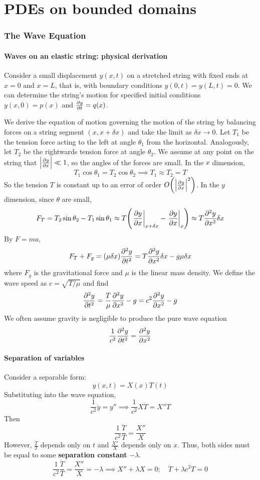 \documentclass[a4paper]{article}
\begin{document}
\clearpage

\part{PDEs on bounded domains}
\section{The Wave Equation}
\subsection{Waves on an elastic string: physical derivation}
Consider a small displacement \( y(x,t) \) on a stretched string with fixed ends at \( x = 0 \) and \( x = L \), that is, with boundary conditions \( y(0,t) = y(L,t) = 0 \).
We can determine the string's motion for specified initial conditions \( y(x,0) = p(x) \) and \( \pdv{y}{t}(x,0) = q(x) \).

We derive the equation of motion governing the motion of the string by balancing forces on a string segment \( (x,x+\delta x) \) and take the limit as \( \delta x \to 0 \).
Let \( T_1 \) be the tension force acting to the left at angle \( \theta_1 \) from the horizontal.
Analogously, let \( T_2 \) be the rightwards tension force at angle \( \theta_2 \).
We assume at any point on the string that \( \abs{\pdv{y}{x}} \ll 1 \), so the angles of the forces are small.
In the \( x \) dimension,
\[
	T_1 \cos \theta_1 = T_2 \cos \theta_2 \implies T_1 \approx T_2 = T
\]
So the tension \( T \) is constant up to an error of order \( O\qty(\abs{\pdv{y}{x}
}^2) \).
In the \( y \) dimension, since \( \theta \) are small,
\[
	F_T = T_2 \sin \theta_2 - T_1 \sin \theta_1 \approx T \qty(\eval{\pdv{y}{x}}_{x + \delta x} - \eval{\pdv{y}{x}}_x) \approx T \pdv[2]{y}{x} \delta x
\]
By \( F = ma \),
\[
	F_T + F_g = (\mu \delta x) \pdv[2]{y}{t} = T \pdv[2]{y}{x} \delta x - g \mu \delta x
\]
where \( F_g \) is the gravitational force and \( \mu \) is the linear mass density.
We define the wave speed as
$ c = \sqrt{T/\mu} $
and find
\[
	\pdv[2]{y}{t} = \frac{T}{\mu} \pdv[2]{y}{x} - g = c^2 \pdv[2]{y}{x}-g
\]
We often assume gravity is negligible to produce the pure wave equation
\[
	\frac{1}{c^2} \pdv[2]{y}{t} = \pdv[2]{y}{x} 
\]

\subsection{Separation of variables}

Consider a separable form:
\[
	y(x,t) = X(x) T(t)
\]
Substituting into the wave equation,
\[
	\frac{1}{c^2} \ddot y = y'' \implies \frac{1}{c^2} X \ddot T = X'' T
\]
Then
\[
	\frac{1}{c^2}\frac{\ddot T}{T} = \frac{X''}{X}
\]
However, \( \frac{\ddot T}{T} \) depends only on \( t \) and \( \frac{X''}{X} \) depends only on \( x \).
Thus, both sides must be equal to some \textbf{separation constant} \( -\lambda \).
\[
	\frac{1}{c^2}\frac{\ddot T}{T} = \frac{X''}{X} = -\lambda \implies X'' + \lambda X = 0;\quad \ddot T + \lambda c^2 T = 0
\]
\end{document}
